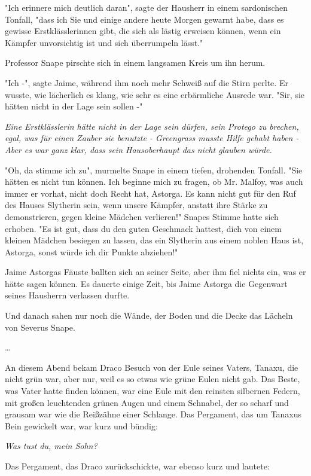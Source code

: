 {"Ich erinnere mich deutlich daran", sagte der Hausherr in einem sardonischen Tonfall, "dass ich Sie und einige andere heute Morgen gewarnt habe, dass es gewisse Erstklässlerinnen gibt, die sich als lästig erweisen können, wenn ein Kämpfer unvorsichtig ist und sich überrumpeln lässt."

Professor Snape pirschte sich in einem langsamen Kreis um ihn herum.

"Ich -", sagte Jaime, während ihm noch mehr Schweiß auf die Stirn perlte. Er wusste, wie lächerlich es klang, wie sehr es eine erbärmliche Ausrede war. "Sir, sie hätten nicht in der Lage sein sollen -"

\emph{Eine Erstklässlerin hätte nicht in der Lage sein dürfen, sein Protego zu brechen, egal, was für einen Zauber sie benutzte - Greengrass musste Hilfe gehabt haben - Aber es war ganz klar, dass sein Hausoberhaupt das nicht glauben würde.}

"Oh, da stimme ich zu", murmelte Snape in einem tiefen, drohenden Tonfall. "Sie hätten es nicht tun können. Ich beginne mich zu fragen, ob Mr. Malfoy, was auch immer er vorhat, nicht doch Recht hat, Astorga. Es kann nicht gut für den Ruf des Hauses Slytherin sein, wenn unsere Kämpfer, anstatt ihre Stärke zu demonstrieren, gegen kleine Mädchen verlieren!" Snapes Stimme hatte sich erhoben. "Es ist gut, dass du den guten Geschmack hattest, dich von einem kleinen Mädchen besiegen zu lassen, das ein Slytherin aus einem noblen Haus ist, Astorga, sonst würde ich dir Punkte abziehen!"

Jaime Astorgas Fäuste ballten sich an seiner Seite, aber ihm fiel nichts ein, was er hätte sagen können. Es dauerte einige Zeit, bis Jaime Astorga die Gegenwart seines Hausherrn verlassen durfte.

Und danach sahen nur noch die Wände, der Boden und die Decke das Lächeln von Severus Snape.

…

An diesem Abend bekam Draco Besuch von der Eule seines Vaters, Tanaxu, die nicht grün war, aber nur, weil es so etwas wie grüne Eulen nicht gab. Das Beste, was Vater hatte finden können, war eine Eule mit den reinsten silbernen Federn, mit großen leuchtenden grünen Augen und einem Schnabel, der so scharf und grausam war wie die Reißzähne einer Schlange. Das Pergament, das um Tanaxus Bein gewickelt war, war kurz und bündig:

\emph{Was tust du, mein Sohn?}

Das Pergament, das Draco zurückschickte, war ebenso kurz und lautete:

}
